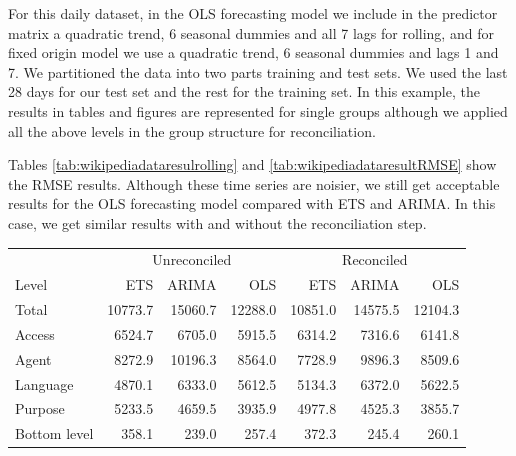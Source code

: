 \documentclass[11pt,a4paper,]{article}
\let\origtable\table
\let\endorigtable\endtable
\renewenvironment{table}[1][2] {
    \expandafter\origtable\expandafter[!htbp]
} {
    \endorigtable
}
\begin{document}
For this daily dataset, in the OLS forecasting model we include in the
predictor matrix a quadratic trend, 6 seasonal dummies and all 7 lags
for rolling, and for fixed origin model we use a quadratic trend, 6
seasonal dummies and lags 1 and 7. We partitioned the data into two
parts training and test sets. We used the last 28 days for our test set
and the rest for the training set. In this example, the results in
tables and figures are represented for single groups although we applied
all the above levels in the group structure for reconciliation.

Tables \ref{tab:wikipediadataresulrolling} and
\ref{tab:wikipediadataresultRMSE} show the RMSE results. Although these
time series are noisier, we still get acceptable results for the OLS
forecasting model compared with ETS and ARIMA. In this case, we get
similar results with and without the reconciliation step.

\begin{table}[!h]

\caption{\label{tab:wikipediadataresulrolling}Mean(RMSE) for ETS, ARIMA and OLS with and without reconciliation - Rolling origin - Wikipedia dataset}
\centering
\begin{tabular}{lrrrrrr}
\toprule
\multicolumn{1}{c}{} & \multicolumn{3}{c}{Unreconciled} & \multicolumn{3}{c}{Reconciled} \\
\cmidrule(l{2pt}r{2pt}){2-4} \cmidrule(l{2pt}r{2pt}){5-7}
Level & ETS & ARIMA & OLS & ETS & ARIMA & OLS\\
\midrule
Total & 10773.7 & 15060.7 & 12288.0 & 10851.0 & 14575.5 & 12104.3\\
Access & 6524.7 & 6705.0 & 5915.5 & 6314.2 & 7316.6 & 6141.8\\
Agent & 8272.9 & 10196.3 & 8564.0 & 7728.9 & 9896.3 & 8509.6\\
Language & 4870.1 & 6333.0 & 5612.5 & 5134.3 & 6372.0 & 5622.5\\
Purpose & 5233.5 & 4659.5 & 3935.9 & 4977.8 & 4525.3 & 3855.7\\
Bottom level & 358.1 & 239.0 & 257.4 & 372.3 & 245.4 & 260.1\\
\bottomrule
\end{tabular}
\end{table}
\end{document}
